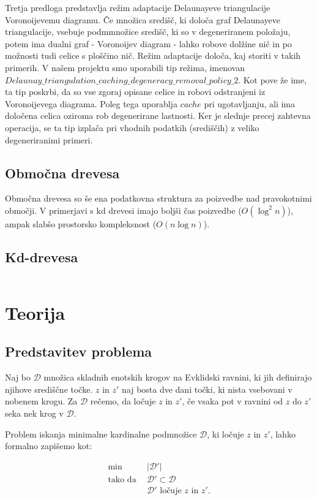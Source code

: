 \documentclass[a4paper, 12pt]{book}
\newcommand{\D}{\ensuremath{\mathcal{D}}}
\begin{document}
Tretja predloga predstavlja režim adaptacije Delaunayeve triangulacije Voronoijevemu diagramu. 
Če množica središč, ki določa graf Delaunayeve triangulacije, vsebuje podmmnožice središč, ki so v degeneriranem položaju, potem ima dualni graf - Voronoijev diagram - lahko robove dolžine nič in po možnosti tudi celice s ploščino nič. Režim adaptacije določa, kaj storiti v takih primerih. V našem projektu smo uporabili tip režima, imenovan $Delaunay\texttt{\_}triangulation\texttt{\_}caching\texttt{\_}degeneracy\texttt{\_}removal\texttt{\_}policy\texttt{\_}2$. Kot pove že ime, ta tip poskrbi, da so vse zgoraj opisane celice in robovi odstranjeni iz Voronoijevega diagrama. Poleg tega uporablja $cache$ pri ugotavljanju, ali ima določena celica oziroma rob degenerirane lastnosti. Ker je slednje precej zahtevna operacija, se ta tip izplača pri vhodnih podatkih (središčih) z veliko degeneriranimi primeri.
 

\section{Območna drevesa}
Območna drevesa so še ena podatkovna struktura za poizvedbe nad pravokotnimi območji. V primerjavi s kd drevesi imajo boljši čas poizvedbe ($O(\log^2 n)$), ampak slabšo prostorsko kompleksnost ($O(n\log n)$).


\section{Kd-drevesa}\begin{equation}
\end{equation}


\chapter{Teorija}
\section{Predstavitev problema}
Naj bo $\D$ množica skladnih enotskih krogov na Evklidski ravnini, ki jih definirajo njihove središčne točke.  $z$ in $z'$ naj bosta dve dani točki, ki nista vsebovani v nobenem krogu. Za $\D$ rečemo, da ločuje $z$ in $z'$, če vsaka pot v ravnini od $z$ do $z'$ seka nek krog v $\D$.

Problem iskanja minimalne kardinalne podmnožice $\D$, ki ločuje $z$ in $z'$, lahko formalno zapišemo kot:

\begin{align*}
	\min ~~		& |\D'|\\
	 \mbox{tako da}~~ & \D'\subset \D\\
				&	\D'\text{ ločuje $z$ in $z'$}. 
\end{align*}
\end{document}
